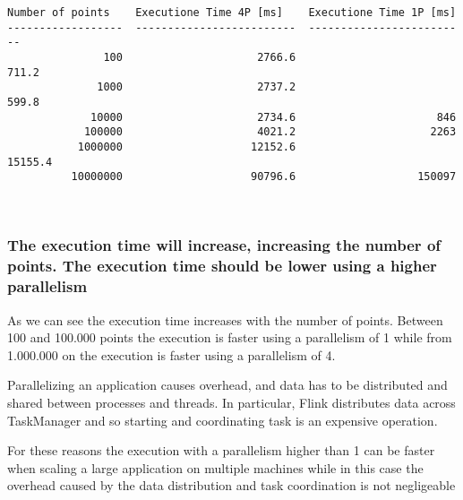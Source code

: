 \documentclass[11pt]{article}
\begin{document}
    \begin{Verbatim}[commandchars=\\\{\}]
  Number of points    Executione Time 4P [ms]    Executione Time 1P [ms]
------------------  -------------------------  -------------------------
               100                     2766.6                      711.2
              1000                     2737.2                      599.8
             10000                     2734.6                      846
            100000                     4021.2                     2263
           1000000                    12152.6                    15155.4
          10000000                    90796.6                   150097

    \end{Verbatim}

    \begin{center}
    \end{center}
    { \hspace*{\fill} \\}
    
    \hypertarget{the-execution-time-will-increase-increasing-the-number-of-points.-the-execution-time-should-be-lower-using-a-higher-parallelism}{%
\subsubsection{The execution time will increase, increasing the number
of points. The execution time should be lower using a higher
parallelism}\label{the-execution-time-will-increase-increasing-the-number-of-points.-the-execution-time-should-be-lower-using-a-higher-parallelism}}

As we can see the execution time increases with the number of points.
Between 100 and 100.000 points the execution is faster using a
parallelism of 1 while from 1.000.000 on the execution is faster using a
parallelism of 4.

Parallelizing an application causes overhead, and data has to be
distributed and shared between processes and threads. In particular,
Flink distributes data across TaskManager and so starting and
coordinating task is an expensive operation.

For these reasons the execution with a parallelism higher than 1 can be
faster when scaling a large application on multiple machines while in
this case the overhead caused by the data distribution and task
coordination is not negligeable


    
    
    
    
\end{document}
